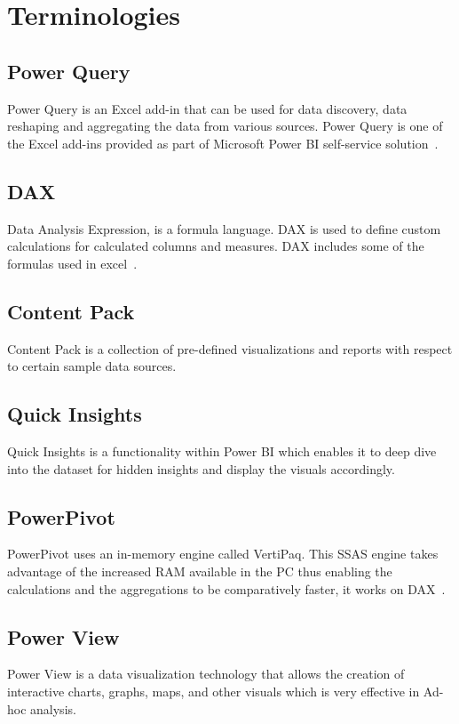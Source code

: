 \section{Terminologies}

\subsection{Power Query}
Power Query is an Excel add-in that can be used for data 
discovery, data reshaping and aggregating the data from various sources. 
Power Query is one of the Excel add-ins provided as part of Microsoft Power 
BI self-service solution~\cite{hid-sp18-418-powerbi-intro}.

\subsection{DAX}
Data Analysis Expression, is a formula language. DAX is used to define 
custom calculations for calculated columns and measures. DAX includes some of 
the formulas used in excel~\cite{hid-sp18-418-dax-basics}.

\subsection{Content Pack}
Content Pack is a collection of pre-defined visualizations and reports 
with respect to certain sample data sources.

\subsection{Quick Insights}
Quick Insights is a functionality within Power BI which enables it to 
deep dive into the dataset for hidden insights and display the 
visuals accordingly.

\subsection{PowerPivot}
PowerPivot uses an in-memory engine called VertiPaq. 
This SSAS engine takes advantage of the increased RAM available in the 
PC thus enabling the calculations and the aggregations to be comparatively 
faster, it works on DAX~\cite{hid-sp18-418-powerpivot}.

\subsection{Power View}
Power View is a data visualization technology that allows the 
creation of interactive charts, graphs, maps, and other visuals which is 
very effective in Ad-hoc analysis.

